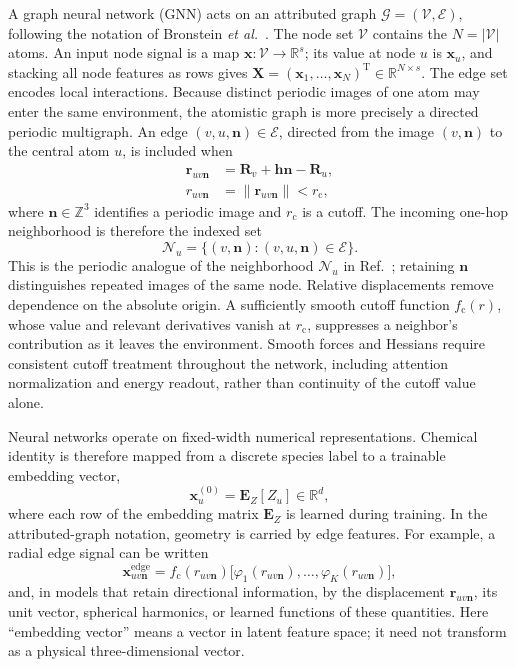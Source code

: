 \documentclass[10pt,a4paper,twocolumn]{article}
\begin{document}
A graph neural network (GNN) acts on an attributed graph
$\mathcal G=(\mathcal V,\mathcal E)$, following the notation of
Bronstein \emph{et al.}\ \cite{bronstein2021}. The node set $\mathcal V$
contains the $N=|\mathcal V|$ atoms. An input node signal is a map
$\bm x:\mathcal V\to\mathbb R^s$; its value at node $u$ is
$\bm x_u$, and stacking all node features as rows gives
$\bm X=(\bm x_1,\ldots,\bm x_N)^{\mathrm T}\in\mathbb R^{N\times s}$.
The edge set encodes local interactions. Because distinct periodic images of
one atom may enter the same environment, the atomistic graph is more precisely
a directed periodic multigraph. An edge $(v,u,\bm n)\in\mathcal E$, directed
from the image $(v,\bm n)$ to the central atom $u$, is included when
\begin{align}
  \bm r_{uv\bm n}
    &= \bm R_v+\bm h\bm n-\bm R_u,
  \\
  r_{uv\bm n}&=\lVert\bm r_{uv\bm n}\rVert < r_{\mathrm c},
  \label{eq:periodic-edge}
\end{align}
where $\bm n\in\mathbb Z^3$ identifies a periodic image and
$r_{\mathrm c}$ is a cutoff. The incoming one-hop neighborhood is therefore
the indexed set
\begin{equation}
  \mathcal N_u
  =\{(v,\bm n):(v,u,\bm n)\in\mathcal E\}.
  \label{eq:periodic-neighborhood}
\end{equation}
This is the periodic analogue of the neighborhood $\mathcal N_u$ in
Ref.~\cite{bronstein2021}; retaining $\bm n$ distinguishes repeated images of
the same node. Relative displacements remove dependence on the absolute
origin. A sufficiently smooth cutoff function $f_{\mathrm c}(r)$, whose value
and relevant derivatives vanish at $r_{\mathrm c}$, suppresses a neighbor's
contribution as it leaves the environment. Smooth forces and Hessians require
consistent cutoff treatment throughout the network, including attention
normalization and energy readout, rather than continuity of the cutoff value
alone.

Neural networks operate on fixed-width numerical representations. Chemical
identity is therefore mapped from a discrete species label to a trainable
embedding vector,
\begin{equation}
  \bm x_u^{(0)}=\bm E_Z[Z_u]\in\mathbb R^d,
  \label{eq:species-embedding}
\end{equation}
where each row of the embedding matrix $\bm E_Z$ is learned during training.
In the attributed-graph notation, geometry is carried by edge features. For
example, a radial edge signal can be written
\begin{equation}
  \bm x_{uv\bm n}^{\mathrm{edge}}
  =f_{\mathrm c}(r_{uv\bm n})
   \bigl[\varphi_1(r_{uv\bm n}),\ldots,
          \varphi_K(r_{uv\bm n})\bigr],
  \label{eq:radial-embedding}
\end{equation}
and, in models that retain directional information, by the displacement
$\bm r_{uv\bm n}$, its unit vector, spherical harmonics, or learned functions of
these quantities. Here ``embedding vector'' means a vector in latent feature
space; it need not transform as a physical three-dimensional vector.
\end{document}
